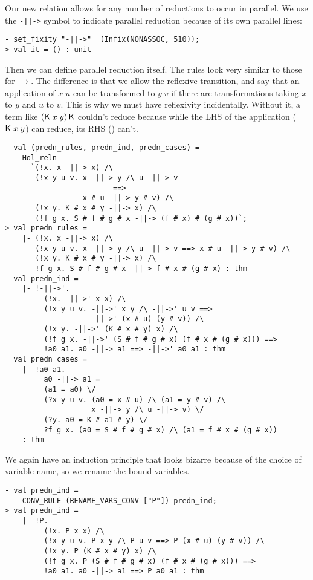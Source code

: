 Our new relation allows for any number of reductions to occur in
parallel.  We use the \texttt{-||->} symbol to indicate parallel
reduction because of its own parallel lines:
\begin{session}
\begin{verbatim}
- set_fixity "-||->"  (Infix(NONASSOC, 510));
> val it = () : unit
\end{verbatim}
\end{session}
    Then we can define parallel reduction itself.  The rules look very
    similar to those for $\rightarrow$.  The difference is that we
    allow the reflexive transition, and say that an application of
    $x\;u$ can be transformed to $y\;v$ if there are transformations
    taking $x$ to $y$ and $u$ to $v$.  This is why we must have
    reflexivity incidentally.  Without it, a term like
    $({\sf K}\;x\;y)\,{\sf K}$ couldn't reduce because while the LHS of the
    application (${\sf K}\;x\;y$) can reduce, its RHS (\KC) can't.
\begin{session}
\begin{verbatim}
- val (predn_rules, predn_ind, predn_cases) =
    Hol_reln
      `(!x. x -||-> x) /\
       (!x y u v. x -||-> y /\ u -||-> v
                         ==>
                  x # u -||-> y # v) /\
       (!x y. K # x # y -||-> x) /\
       (!f g x. S # f # g # x -||-> (f # x) # (g # x))`;
> val predn_rules =
    |- (!x. x -||-> x) /\
       (!x y u v. x -||-> y /\ u -||-> v ==> x # u -||-> y # v) /\
       (!x y. K # x # y -||-> x) /\
       !f g x. S # f # g # x -||-> f # x # (g # x) : thm
  val predn_ind =
    |- !-||->'.
         (!x. -||->' x x) /\
         (!x y u v. -||->' x y /\ -||->' u v ==>
                    -||->' (x # u) (y # v)) /\
         (!x y. -||->' (K # x # y) x) /\
         (!f g x. -||->' (S # f # g # x) (f # x # (g # x))) ==>
         !a0 a1. a0 -||-> a1 ==> -||->' a0 a1 : thm
  val predn_cases =
    |- !a0 a1.
         a0 -||-> a1 =
         (a1 = a0) \/
         (?x y u v. (a0 = x # u) /\ (a1 = y # v) /\
                    x -||-> y /\ u -||-> v) \/
         (?y. a0 = K # a1 # y) \/
         ?f g x. (a0 = S # f # g # x) /\ (a1 = f # x # (g # x))
    : thm
\end{verbatim}
\end{session}
We again have an induction principle that looks bizarre because of the
choice of variable name, so we rename the bound variables.
\begin{session}
\begin{verbatim}
- val predn_ind =
    CONV_RULE (RENAME_VARS_CONV ["P"]) predn_ind;
> val predn_ind =
    |- !P.
         (!x. P x x) /\
         (!x y u v. P x y /\ P u v ==> P (x # u) (y # v)) /\
         (!x y. P (K # x # y) x) /\
         (!f g x. P (S # f # g # x) (f # x # (g # x))) ==>
         !a0 a1. a0 -||-> a1 ==> P a0 a1 : thm
\end{verbatim}
\end{session}
